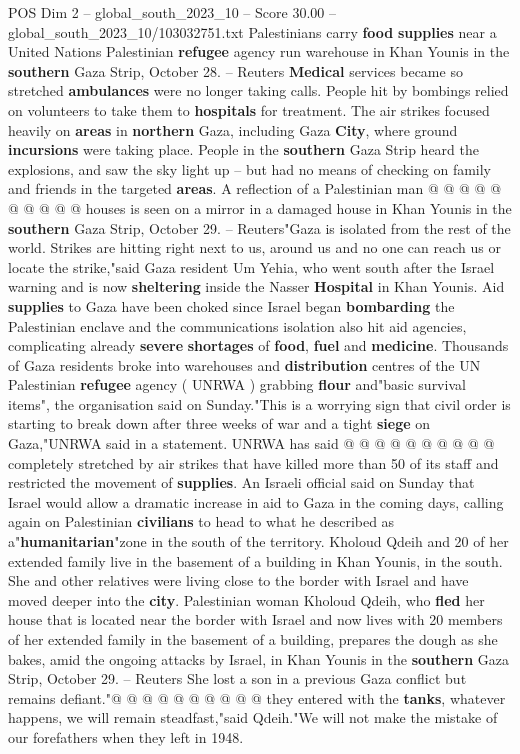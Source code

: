 \begin{textsample}{POS Dim 2 – global\_south\_2023\_10 – Score 30.00 – global\_south\_2023\_10/103032751.txt}
Palestinians carry \textbf{food} \textbf{supplies} near a United Nations Palestinian \textbf{refugee} agency run warehouse in Khan Younis in the \textbf{southern} Gaza Strip, October 28. -- Reuters \textbf{Medical} services became so stretched \textbf{ambulances} were no longer taking calls.
People hit by bombings relied on volunteers to take them to \textbf{hospitals} for treatment.
The air strikes focused heavily on \textbf{areas} in \textbf{northern} Gaza, including Gaza \textbf{City}, where ground \textbf{incursions} were taking place.
People in the \textbf{southern} Gaza Strip heard the explosions, and saw the sky light up -- but had no means of checking on family and friends in the targeted \textbf{areas}.
A reflection of a Palestinian man @ @ @ @ @ @ @ @ @ @ houses is seen on a mirror in a damaged house in Khan Younis in the \textbf{southern} Gaza Strip, October 29. -- Reuters"Gaza is isolated from the rest of the world.
Strikes are hitting right next to us, around us and no one can reach us or locate the strike,"said Gaza resident Um Yehia, who went south after the Israel warning and is now \textbf{sheltering} inside the Nasser \textbf{Hospital} in Khan Younis.
Aid \textbf{supplies} to Gaza have been choked since Israel began \textbf{bombarding} the Palestinian enclave and the communications isolation also hit aid agencies, complicating already \textbf{severe} \textbf{shortages} of \textbf{food}, \textbf{fuel} and \textbf{medicine}.
Thousands of Gaza residents broke into warehouses and \textbf{distribution} centres of the UN Palestinian \textbf{refugee} agency ( UNRWA ) grabbing \textbf{flour} and"basic survival items", the organisation said on Sunday."This is a worrying sign that civil order is starting to break down after three weeks of war and a tight \textbf{siege} on Gaza,"UNRWA said in a statement.
UNRWA has said @ @ @ @ @ @ @ @ @ @ completely stretched by air strikes that have killed more than 50 of its staff and restricted the movement of \textbf{supplies}.
An Israeli official said on Sunday that Israel would allow a dramatic increase in aid to Gaza in the coming days, calling again on Palestinian \textbf{civilians} to head to what he described as a"\textbf{humanitarian}"zone in the south of the territory.
Kholoud Qdeih and 20 of her extended family live in the basement of a building in Khan Younis, in the south.
She and other relatives were living close to the border with Israel and have moved deeper into the \textbf{city}.
Palestinian woman Kholoud Qdeih, who \textbf{fled} her house that is located near the border with Israel and now lives with 20 members of her extended family in the basement of a building, prepares the dough as she bakes, amid the ongoing attacks by Israel, in Khan Younis in the \textbf{southern} Gaza Strip, October 29. -- Reuters She lost a son in a previous Gaza conflict but remains defiant."@ @ @ @ @ @ @ @ @ @ they entered with the \textbf{tanks}, whatever happens, we will remain steadfast,"said Qdeih."We will not make the mistake of our forefathers when they left in 1948.

\end{textsample}
